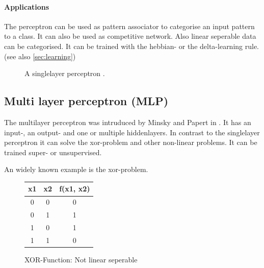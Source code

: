 \documentclass[10pt,a4paper,DIV=11]{scrreprt}
\begin{document}
\paragraph{Applications}
The perceptron can be used as pattern associator to categorise an input pattern to a class. It can also be used as competitive network. Also linear seperable data can be categorised.
It can be trained with the hebbian- or the delta-learning rule.(see also \eqref{sec:learning})

\begin{center}
	\begin{figure}[H]
		\centering
		\caption{A singlelayer perceptron \cite{PERSIN}.}
		\label{fig:neuron}
	\end{figure}
\end{center}


\subsection{Multi layer perceptron (MLP)} \label{sec:mlp}
The multilayer perceptron was intruduced by Minsky and Papert in . It has an input-, an output- and
one or multiple hiddenlayers. In contrast to the singlelayer perceptron it can solve the xor-problem and other non-linear problems. It can be trained super- or unsupervised.

An widely known example is the xor-problem.

\begin{figure}[H]
	\centering
	\begin{tabular}{|c|c|c|}
		\hline
		x1 & x2 & f(x1, x2)\\
		\hline
		0 & 0 & 0 \\
		\hline
		0 & 1 & 1 \\
		\hline
		1 & 0 & 1 \\
		\hline
		1 & 1 & 0 \\
		\hline
	\end{tabular}
	\caption{XOR-Function: Not linear seperable}
	\label{fig:nlinsep}
	
	
\end{figure}
\end{document}
